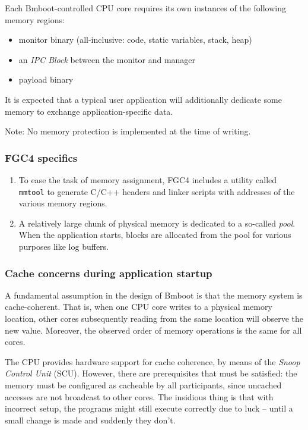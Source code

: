 Each Bmboot-controlled CPU core requires its own instances of the following memory regions:

\begin{itemize}
    \item monitor binary (all-inclusive: code, static variables, stack, heap)
    \item an \textit{IPC Block} between the monitor and manager
    \item payload binary
\end{itemize}

It is expected that a typical user application will additionally dedicate some memory to exchange application-specific data.

Note: No memory protection is implemented at the time of writing.

\subsubsection*{FGC4 specifics}

\begin{enumerate}
    \item To ease the task of memory assignment, FGC4 includes a utility called \texttt{mmtool} to generate C/C++ headers and linker scripts with addresses of the various memory regions.
    \item A relatively large chunk of physical memory is dedicated to a so-called \textit{pool}. When the application starts, blocks are allocated from the pool for various purposes like log buffers.
\end{enumerate}


\subsubsection{Cache concerns during application startup}

A fundamental assumption in the design of Bmboot is that the memory system is cache-coherent. That is, when one CPU core writes to a physical memory location, other cores subsequently reading from the same location will observe the new value. Moreover, the observed order of memory operations is the same for all cores.

The CPU provides hardware support for cache coherence, by means of the \textit{Snoop Control Unit} (SCU). However, there are prerequisites that must be satisfied: the memory must be configured as cacheable by all participants, since uncached accesses are not broadcast to other cores.
The insidious thing is that with incorrect setup, the programs might still execute correctly due to luck -- until a small change is made and suddenly they don't.

